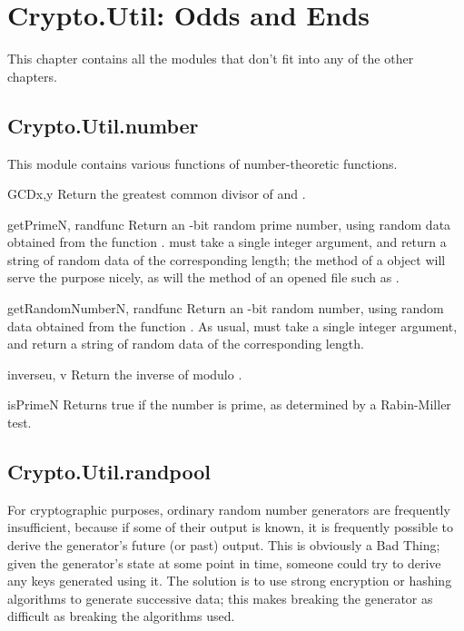 \documentclass{howto}
\begin{document}
\section{Crypto.Util: Odds and Ends}
This chapter contains all the modules that don't fit into any of the
other chapters.  

\subsection{Crypto.Util.number}

This module contains various functions of number-theoretic functions.  

\begin{funcdesc}{GCD}{x,y}
Return the greatest common divisor of  and .
\end{funcdesc}

\begin{funcdesc}{getPrime}{N, randfunc}
Return an -bit random prime number, using random data obtained
from the function .   must take a single
integer argument, and return a string of random data of the
corresponding length; the  method of a
 object will serve the purpose nicely, as will the
 method of an opened file such as .
\end{funcdesc}

\begin{funcdesc}{getRandomNumber}{N, randfunc}
Return an -bit random number, using random data obtained from the
function .  As usual,  must take a single
integer argument, and return a string of random data of the
corresponding length.
\end{funcdesc}

\begin{funcdesc}{inverse}{u, v}
Return the inverse of  modulo .
\end{funcdesc}

\begin{funcdesc}{isPrime}{N}
Returns true if the number  is prime, as determined by a
Rabin-Miller test.
\end{funcdesc}

\subsection{Crypto.Util.randpool}
For cryptographic purposes, ordinary random number generators are
frequently insufficient, because if some of their output is known, it is
frequently possible to derive the generator's future (or past) output.
This is obviously a Bad Thing; given the generator's state at some point
in time, someone could try to derive any keys generated using it.  The
solution is to use strong encryption or hashing algorithms to generate
successive data; this makes breaking the generator as difficult as
breaking the algorithms used.
\end{document}
